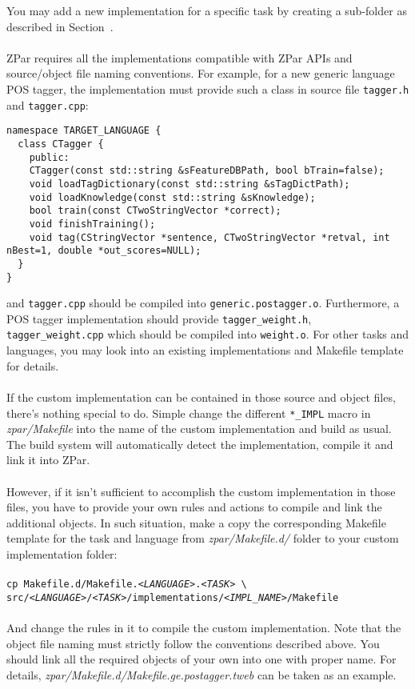 \documentclass[12pt]{article}
\begin{document}
\begin{CJK}{GBK}{song}
You may add a new implementation for a specific task
by creating a sub-folder as described in Section~.
\\
\\
ZPar requires all the implementations compatible with
ZPar APIs and source/object file naming conventions.
For example, for a new generic language POS tagger,
the implementation must provide
such a class in source file \texttt{tagger.h} and \texttt{tagger.cpp}:
\begin{verbatim}
namespace TARGET_LANGUAGE {
  class CTagger {
    public:
    CTagger(const std::string &sFeatureDBPath, bool bTrain=false);
    void loadTagDictionary(const std::string &sTagDictPath);
    void loadKnowledge(const std::string &sKnowledge);
    bool train(const CTwoStringVector *correct);
    void finishTraining();
    void tag(CStringVector *sentence, CTwoStringVector *retval, int nBest=1, double *out_scores=NULL);
  }
}
\end{verbatim}
and \texttt{tagger.cpp} should be compiled into \texttt{generic.postagger.o}.
Furthermore, a POS tagger implementation should provide
\texttt{tagger\_weight.h}, \texttt{tagger\_weight.cpp}
which should be compiled into \texttt{weight.o}.
For other tasks and languages, you may look into an existing implementations
and Makefile template for details.
\\
\\
If the custom implementation can be contained 
in those source and object files,
there's nothing special to do.
Simple change the different \texttt{*\_IMPL} macro in \textit{zpar/Makefile}
into the name of the custom implementation and build as usual.
The build system will automatically detect the implementation,
compile it and link it into ZPar.
\\
\\
However, if it isn't sufficient to accomplish
the custom implementation in those files,
you have to provide your own rules and actions
to compile and link the additional objects.
In such situation, make a copy the corresponding Makefile template
for the task and language 
from \textit{zpar/Makefile.d/} folder
to your custom implementation folder:
\\
\\
\hspace{3cm}\texttt{cp Makefile.d/Makefile.\textit{<LANGUAGE>}.\textit{<TASK>} \textbackslash \\
\hspace{3cm}\quad src/\textit{<LANGUAGE>}/\textit{<TASK>}/implementations/\textit{<IMPL\_NAME>}/Makefile}
\\
\\
And change the rules in it to compile the custom implementation.
Note that the object file naming must strictly follow
the conventions described above.
You should link all the required objects of your own into one with proper name.
For details, \textit{zpar/Makefile.d/Makefile.ge.postagger.tweb} can be taken as an example.

\end{CJK}
\end{document}

